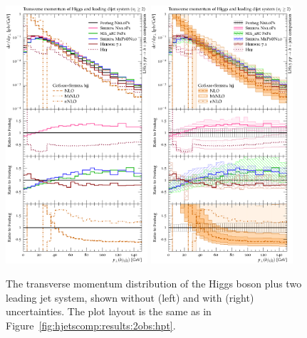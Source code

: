 \begin{figure}[t!]
  \centering
  \includegraphics[width=0.47\textwidth]{figures/hjetscomp_u_Hjj_pT_incl.pdf}
  \hfill
  \includegraphics[width=0.47\textwidth]{figures/hjetscomp_Hjj_pT_incl.pdf}
  \caption{\label{fig:hjetscomp:results:2obs:hjj_pt}%
    The transverse momentum distribution of the Higgs boson plus two
    leading jet system, shown without (left) and with (right)
    uncertainties. The plot layout is the same as in
    Figure~\ref{fig:hjetscomp:results:2obs:hpt}.}
\end{figure}

